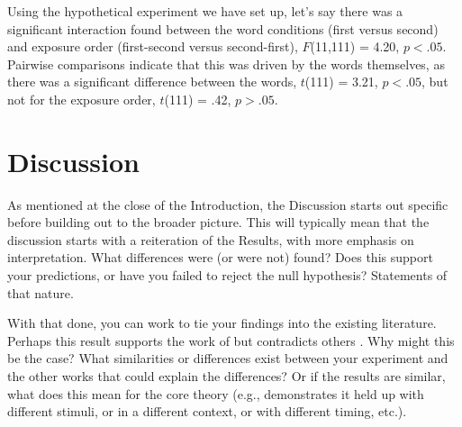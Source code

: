 \documentclass[stu,12pt,floatsintext]{apa7}
\begin{document}
\newcommand{\ttestSig}[2]{$t$(#1) = #2, $p < .05$}
\newcommand{\ttestInsig}[2]{$t$(#1) = #2, $p > .05$}
\newcommand{\anovaSig}[3]{$F$(#1,#2) = #3, $p < .05$}
\newcommand{\anovaInsig}[3]{$F$(#1,#2) = #3, $p > .05$}

Using the hypothetical experiment we have set up, let's say there was a significant interaction found between the word conditions (first versus second) and exposure order (first-second versus second-first), \anovaSig{11}{111}{4.20}. Pairwise comparisons indicate that this was driven by the words themselves, as there was a significant difference between the words, \ttestSig{111}{3.21}, but not for the exposure order, \ttestInsig{111}{.42}.

\section{Discussion}

As mentioned at the close of the Introduction, the Discussion starts out specific before building out to the broader picture. This will typically mean that the discussion starts with a reiteration of the Results, with more emphasis on interpretation. What differences were (or were not) found? Does this support your predictions, or have you failed to reject the null hypothesis? Statements of that nature.

With that done, you can work to tie your findings into the existing literature. Perhaps this result supports the work of \textcite{Contributor2023} but contradicts others \parencite[e.g.,][]{Sample2024}. %
Why might this be the case? What similarities or differences exist between your experiment and the other works that could explain the differences? Or if the results are similar, what does this mean for the core theory (e.g., demonstrates it held up with different stimuli, or in a different context, or with different timing, etc.).
\end{document}
